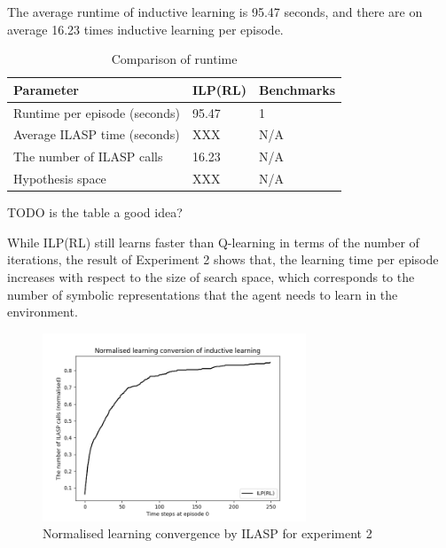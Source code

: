 The average runtime of inductive learning is 95.47 seconds, and there are on average 16.23 times inductive learning per episode.

\begin{table}[!ht!b]
\centering
\begin{tabular}{lll}
\hline
Parameter            & ILP(RL)    & Benchmarks      \\ \hline
Runtime per episode (seconds) & 95.47        & 1        \\
Average ILASP time (seconds)& XXX        & N/A        \\
The number of ILASP calls &  16.23      & N/A       \\
Hypothesis space &  XXX      & N/A       \\
\end{tabular}
\caption{Comparison of runtime}
\label{param}
\end{table}
TODO is the table a good idea?

While ILP(RL) still learns faster than Q-learning in terms of the number of iterations, 
the result of Experiment 2 shows that, the learning time per episode increases with respect to the size of search space, 
which corresponds to the number of symbolic representations that the agent needs to learn in the environment.

\begin{figure}[!htb]
\centering
\includegraphics[width=0.7\textwidth]{./figures/experiment2_ilasp}
\caption{Normalised learning convergence by ILASP for experiment 2}
\label{experiment2_ilasp}
\end{figure}

